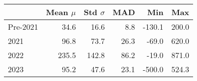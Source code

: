 \begin{tabular}{lrrrrr}
\toprule
 & Mean $\mu$ & Std $\sigma$ & MAD & Min & Max \\
\midrule
Pre-2021 & 34.6 & 16.6 & 8.8 & -130.1 & 200.0 \\
2021 & 96.8 & 73.7 & 26.3 & -69.0 & 620.0 \\
2022 & 235.5 & 142.8 & 86.2 & -19.0 & 871.0 \\
2023 & 95.2 & 47.6 & 23.1 & -500.0 & 524.3 \\
\bottomrule
\end{tabular}
